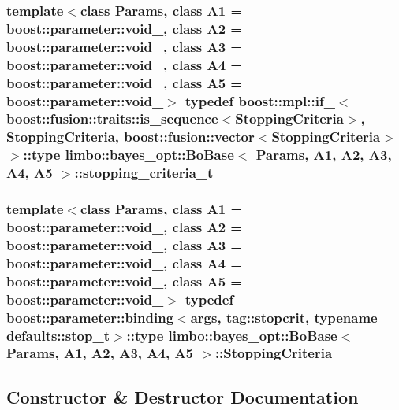\subsubsection[{stopping\+\_\+criteria\+\_\+t}]{\setlength{\rightskip}{0pt plus 5cm}template$<$class Params, class A1 = boost\+::parameter\+::void\+\_\+, class A2 = boost\+::parameter\+::void\+\_\+, class A3 = boost\+::parameter\+::void\+\_\+, class A4 = boost\+::parameter\+::void\+\_\+, class A5 = boost\+::parameter\+::void\+\_\+$>$ typedef boost\+::mpl\+::if\+\_\+$<$boost\+::fusion\+::traits\+::is\+\_\+sequence$<${\bf Stopping\+Criteria}$>$, {\bf Stopping\+Criteria}, boost\+::fusion\+::vector$<${\bf Stopping\+Criteria}$>$ $>$\+::type {\bf limbo\+::bayes\+\_\+opt\+::\+Bo\+Base}$<$ Params, A1, A2, A3, A4, A5 $>$\+::{\bf stopping\+\_\+criteria\+\_\+t}}\label{classlimbo_1_1bayes__opt_1_1_bo_base_ad045a21de8950f3671f6b156f2271e44}
\hypertarget{classlimbo_1_1bayes__opt_1_1_bo_base_ac9ab3f37c746dcf70ef7096a89dd1b6c}{}
\subsubsection[{Stopping\+Criteria}]{\setlength{\rightskip}{0pt plus 5cm}template$<$class Params, class A1 = boost\+::parameter\+::void\+\_\+, class A2 = boost\+::parameter\+::void\+\_\+, class A3 = boost\+::parameter\+::void\+\_\+, class A4 = boost\+::parameter\+::void\+\_\+, class A5 = boost\+::parameter\+::void\+\_\+$>$ typedef boost\+::parameter\+::binding$<${\bf args}, tag\+::stopcrit, typename {\bf defaults\+::stop\+\_\+t}$>$\+::type {\bf limbo\+::bayes\+\_\+opt\+::\+Bo\+Base}$<$ Params, A1, A2, A3, A4, A5 $>$\+::{\bf Stopping\+Criteria}}\label{classlimbo_1_1bayes__opt_1_1_bo_base_ac9ab3f37c746dcf70ef7096a89dd1b6c}


\subsection{Constructor \& Destructor Documentation}
\hypertarget{classlimbo_1_1bayes__opt_1_1_bo_base_a1602cb9a6fa728d8181ee7ec080dd441}{}
